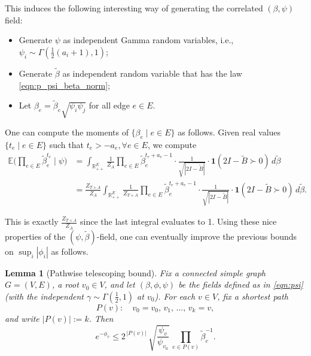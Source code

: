 \documentclass[a4paper, 11pt]{article}
\newcommand{\E}{\mathbb{E}}
\newcommand{\ind}{\mathbf{1}}
\newtheorem{lem}[thm]{Lemma}
\begin{document}
This induces the following interesting way of generating the correlated $(\beta, \psi)$ field:
\begin{itemize}
    \item Generate $\psi$ as independent Gamma random variables, i.e., $\psi_i\sim\Gamma(\frac{1}{2}(a_i+1),1)$;
    \item Generate $\tilde{\beta}$ as independent random variable that has the law \cref{eqn:p_psi_beta_norm};
    \item Let $\beta_e=\tilde{\beta}_e\sqrt{\psi_i\psi_j}$ for all edge $e\in E$.
\end{itemize}


One can compute the moments of $\{\beta_e\mid e\in E\}$ as follows. Given real values $\{t_e\mid e\in E\}$ such that $t_e>-a_e, \forall e\in E$, we compute
\begin{align*}
    \E\Big(\prod_{e\in E}\tilde{\beta}_e^{t_e} \mid \psi\Big)
    &= \int_{\mathbb{R}_{++}^E} \frac{1}{Z_A}\prod_{e\in E}\tilde{\beta}_e^{t_e+a_e-1}\cdot \frac{1}{\sqrt{|2I-\tilde{B}|}}\cdot \ind(2I-\tilde{B}\succ 0) \,d\tilde{\beta}\\
    &= \frac{Z_{T+A}}{Z_A}\int_{\mathbb{R}_{++}^E} \frac{1}{Z_{T+A}}\prod_{e\in E}\tilde{\beta}_e^{t_e+a_e-1}\cdot \frac{1}{\sqrt{|2I-\tilde{B}|}}\cdot \ind(2I-\tilde{B}\succ 0) \,d\tilde{\beta}.
\end{align*}

This is exactly $\frac{Z_{T+A}}{Z_A}$ since the last integral evaluates to 1. Using these nice properties of the $(\psi, \tilde\beta)$-field, one can eventually improve the previous bounds on $\sup_i |\phi_i|$ as follows.

\vspace{.5em}
\begin{lem}[Pathwise telescoping bound]\label{lem:path-telescope}
Fix a connected simple graph $G=(V,E)$, a root $v_0\in V$, and let $(\beta,\phi,\psi)$ be the fields defined as in \eqref{eqn:psi} (with the independent $\gamma\sim\Gamma(\tfrac12,1)$ at $v_0$). For each $v\in V$, fix a shortest path
\[
P(v):\quad v_0=v_0,\,v_1,\,\ldots,\,v_k=v,
\]
and write $|P(v)|:=k$. Then
\begin{equation}\label{eq:path-tele}
e^{-\phi_v}\le 2^{\,|P(v)|}\,\sqrt{\frac{\psi_v}{\psi_{v_0}}}\,\prod_{e\in P(v)}\tilde\beta_e^{-1}.
\end{equation}
\end{lem}
\end{document}
